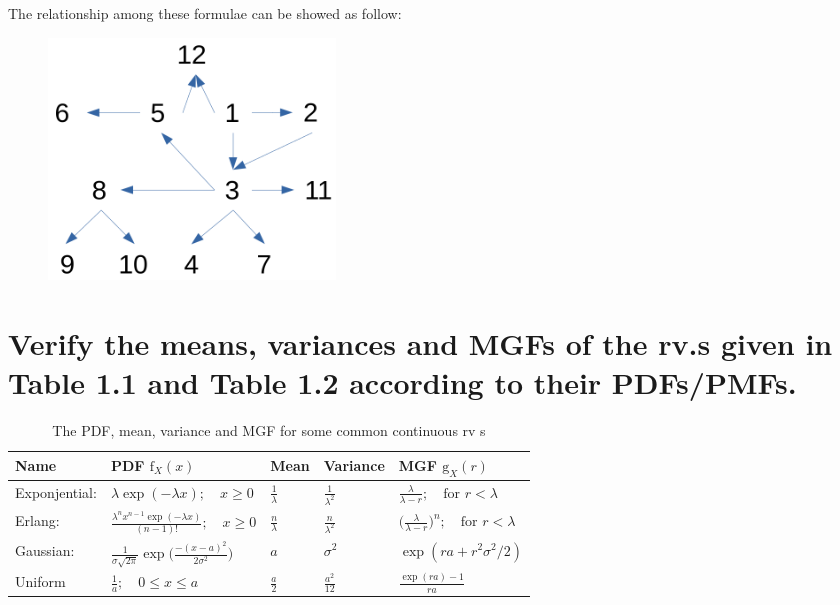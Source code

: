 \documentclass[UTF8]{article}
\begin{document}
    The relationship among these formulae can be showed as follow:
    \begin{figure}[h]
        \centering
        \includegraphics[width=3.0in]{relationship.png}
    \end{figure}

    \section{Verify the means, variances and MGFs of the rv.s given in Table 1.1 and Table 1.2 according to their PDFs/PMFs.}
    \begin{table}[h]
        \centering
        \caption{The PDF, mean, variance and MGF for some common continuous rv s}
        \begin{spacing}{2.0}
            \begin{tabular}{lllll}
                \hline
                Name & PDF $\text{f}_X(x)$ & Mean & Variance & MGF $\text{g}_X(r)$\\
                \hline
                Exponjential: & $\lambda\exp(-\lambda x);\quad x\geq0$ & $\frac{1}{\lambda}$ & $\frac{1}{\lambda^2}$ & $\frac{\lambda}{\lambda-r};\quad\text{for }r<\lambda$\\
                Erlang: & $\frac{\lambda^nx^{n-1}\exp(-\lambda x)}{(n-1)!};\quad x\geq0$ & $\frac{n}{\lambda}$ & $\frac{n}{\lambda^2}$ & $\big(\frac{\lambda}{\lambda-r}\big)^n;\quad\text{for }r<\lambda$\\
                Gaussian: & $\frac{1}{\sigma\sqrt{2\pi}}\exp\big(\frac{-(x-a)^2}{2\sigma^2}\big)$ & $a$ & $\sigma^2$ & $\exp(ra+r^2\sigma^2/2)$\\
                Uniform & $\frac{1}{a};\quad0\leq x\leq a$ & $\frac{a}{2}$ & $\frac{a^2}{12}$ & $\frac{\exp(ra)-1}{ra}$\\
                \hline
            \end{tabular}    
        \end{spacing}
    \end{table}
\end{document}
